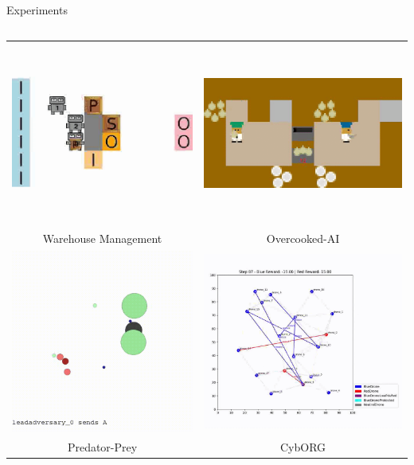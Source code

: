 \documentclass[9pt, aspectratio=169]{beamer}
\begin{document}
\begin{frame}{Experiments}
\begin{columns}[c]
    \begin{column}{0.5\textwidth}
      \begin{tabular}{cc}
        \includegraphics[height=0.35\linewidth]{figures/wm.png}  &
        \includegraphics[height=0.35\linewidth]{figures/overcooked.png}              \\
        \small{Warehouse Management} & \small{Overcooked-AI} \\
        \includegraphics[height=0.5\linewidth]{figures/mpe.png} &
        \includegraphics[height=0.5\linewidth]{figures/cyborg.png}                  \\
        \small{Predator-Prey} & \small{CybORG} \\
      \end{tabular}
    \end{column}
  \end{columns}

\end{frame}
\end{document}
